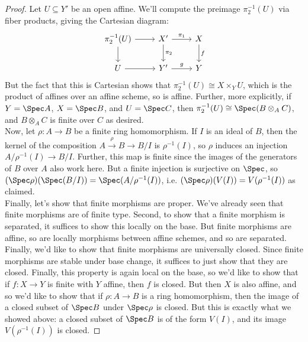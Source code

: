 \begin{proof}
	Let $U \subseteq Y'$ be an open affine. We'll compute the preimage $\pi_2^{-1}(U)$ via fiber products, giving the Cartesian diagram:
	\[ \begin{tikzcd} \pi_2^{-1}(U) \arrow[r] \arrow[d] & X' \arrow[r,"\pi_1"] \arrow[d,"\pi_2"] & X \arrow[d,"f"] \\ U \arrow[r] & Y' \arrow[r,"g"] & Y \end{tikzcd} \]
	But the fact that this is Cartesian shows that $\pi_2^{-1}(U) \cong X \times_Y U$, which is the product of affines over an affine scheme, so is affine. Further, more explicitly, if $Y = \Spec A$, $X = \Spec B$, and $U = \Spec C$, then $\pi_2^{-1}(U) \cong \Spec(B \otimes_A C)$, and $B \otimes_A C$ is finite over $C$ as desired. \\
	
	Now, let $\rho : A \to B$ be a finite ring homomorphism. If $I$ is an ideal of $B$, then the kernel of the composition $A \xrightarrow{\rho} B \to B/I$ is $\rho^{-1}(I)$, so $\rho$ induces an injection $A/\rho^{-1}(I) \to B/I$. Further, this map is finite since the images of the generators of $B$ over $A$ also work here. But a finite injection is surjective on $\Spec$, so $(\Spec\rho)(\Spec(B/I)) = \Spec(A/\rho^{-1}(I))$, i.e. $(\Spec\rho)(V(I)) = V(\rho^{-1}(I))$ as claimed. \\
	
	Finally, let's show that finite morphisms are proper. We've already seen that finite morphisms are of finite type. Second, to show that a finite morphism is separated, it suffices to show this locally on the base. But finite morphisms are affine, so are locally morphisms between affine schemes, and so are separated. Finally, we'd like to show that finite morphisms are universally closed. Since finite morphisms are stable under base change, it suffices to just show that they are closed. Finally, this property is again local on the base, so we'd like to show that if $f : X \to Y$ is finite with $Y$ affine, then $f$ is closed. But then $X$ is also affine, and so we'd like to show that if $\rho : A \to B$ is a ring homomorphism, then the image of a closed subset of $\Spec B$ under $\Spec \rho$ is closed. But this is exactly what we showed above: a closed subset of $\Spec B$ is of the form $V(I)$, and its image $V(\rho^{-1}(I))$ is closed.
\end{proof}
